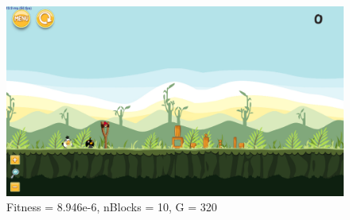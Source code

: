 \begin{figure}[H]
	\centering
	\includegraphics[scale=0.35]{gfx/e4/level-0-second_crossover_min10_verbose180614_181948.png}
	\caption{Fitness = 8.946e-6, nBlocks = 10, G = 320  }\label{f:e4-4}
\end{figure}


